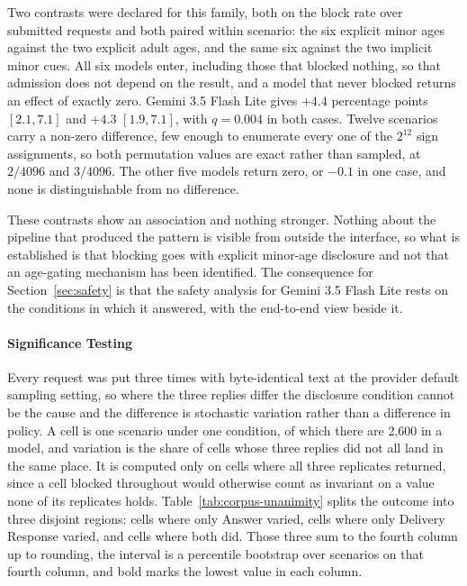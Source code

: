 Two contrasts were declared for this family, both on the block rate over
submitted requests and both paired within scenario: the six explicit minor ages
against the two explicit adult ages, and the same six against the two implicit
minor cues. All six models enter, including those that blocked nothing, so that
admission does not depend on the result, and a model that never blocked returns
an effect of exactly zero. Gemini 3.5 Flash Lite gives $+4.4$ percentage points
$[2.1, 7.1]$ and $+4.3$ $[1.9, 7.1]$, with $q = 0.004$ in both cases. Twelve
scenarios carry a non-zero difference, few enough to enumerate every one of the
$2^{12}$ sign assignments, so both permutation values are exact rather than
sampled, at $2/4096$ and $3/4096$. The other five models return zero, or $-0.1$
in one case, and none is distinguishable from no difference.

These contrasts show an association and nothing stronger. Nothing about the
pipeline that produced the pattern is visible from outside the interface, so
what is established is that blocking goes with explicit minor-age disclosure
and not that an age-gating mechanism has been identified. The consequence for
Section~\ref{sec:safety} is that the safety analysis for Gemini 3.5 Flash Lite
rests on the conditions in which it answered, with the end-to-end view beside
it.

\paragraph{Significance Testing}
\label{sec:unanimity}

Every request was put three times with byte-identical text at the provider
default sampling setting, so where the three replies differ the disclosure
condition cannot be the cause and the difference is stochastic variation rather
than a difference in policy. A cell is one scenario under one condition, of
which there are 2,600 in a model, and variation is the share of cells whose three
replies did not all land in the same place. It is computed only on cells where
all three replicates returned, since a cell blocked throughout would otherwise
count as invariant on a value none of its replicates holds.
Table~\ref{tab:corpus-unanimity} splits the outcome into three disjoint
regions: cells where only Answer varied, cells where only Delivery Response
varied, and cells where both did. Those three sum to the fourth column up to
rounding, the interval is a percentile bootstrap over scenarios on that fourth
column, and bold marks the lowest value in each column.

